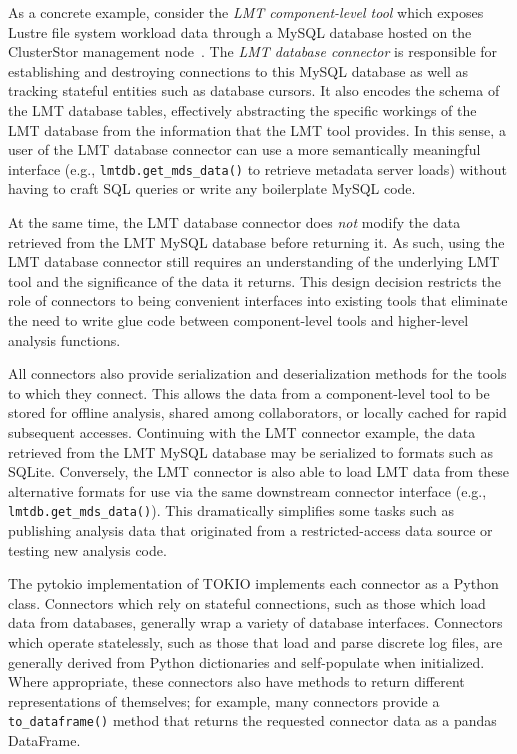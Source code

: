As a concrete example, consider the \emph{LMT component-level tool} which exposes Lustre file system workload data through a MySQL database hosted on the ClusterStor management node~\cite{Keopp2014}.
The \emph{LMT database connector} is responsible for establishing and destroying connections to this MySQL database as well as tracking stateful entities such as database cursors.
It also encodes the schema of the LMT database tables, effectively abstracting the specific workings of the LMT database from the information that the LMT tool provides.
In this sense, a user of the LMT database connector can use a more semantically meaningful interface (e.g., \texttt{lmtdb.get\_mds\_data()} to retrieve metadata server loads) without having to craft SQL queries or write any boilerplate MySQL code.

At the same time, the LMT database connector does \emph{not} modify the data retrieved from the LMT MySQL database before returning it.
As such, using the LMT database connector still requires an understanding of the underlying LMT tool and the significance of the data it returns.
This design decision restricts the role of connectors to being convenient interfaces into existing tools that eliminate the need to write glue code between component-level tools and higher-level analysis functions.

All connectors also provide serialization and deserialization methods for the tools to which they connect.
This allows the data from a component-level tool to be stored for offline analysis, shared among collaborators, or locally cached for rapid subsequent accesses.
Continuing with the LMT connector example, the data retrieved from the LMT MySQL database may be serialized to formats such as SQLite.
Conversely, the LMT connector is also able to load LMT data from these alternative formats for use via the same downstream connector interface (e.g., \texttt{lmtdb.get\_mds\_data()}).
This dramatically simplifies some tasks such as publishing analysis data that originated from a restricted-access data source or testing new analysis code.

The pytokio implementation of TOKIO implements each connector as a Python class.
Connectors which rely on stateful connections, such as those which load data from databases, generally wrap a variety of database interfaces.
Connectors which operate statelessly, such as those that load and parse discrete log files, are generally derived from Python dictionaries and self-populate when initialized.
Where appropriate, these connectors also have methods to return different representations of themselves; for example, many connectors provide a \texttt{to\_dataframe()} method that returns the requested connector data as a pandas DataFrame.

